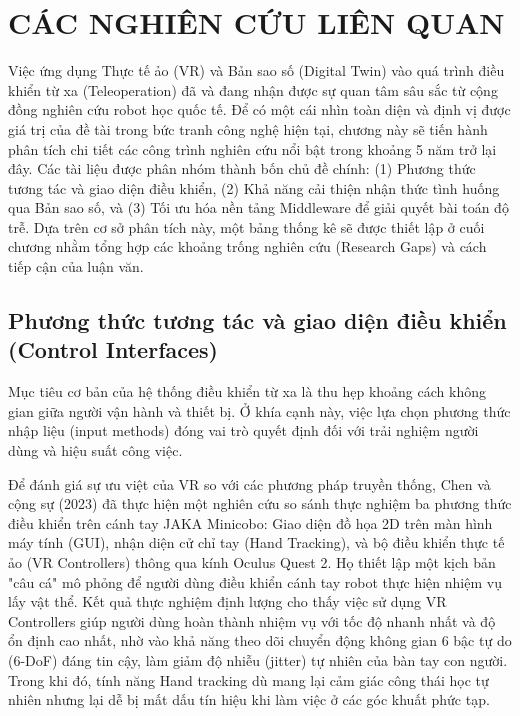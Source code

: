 \chapter{CÁC NGHIÊN CỨU LIÊN QUAN}
\label{chap:related_works}

Việc ứng dụng Thực tế ảo (VR) và Bản sao số (Digital Twin) vào quá trình điều khiển từ xa (Teleoperation) đã và đang nhận được sự quan tâm sâu sắc từ cộng đồng nghiên cứu robot học quốc tế. Để có một cái nhìn toàn diện và định vị được giá trị của đề tài trong bức tranh công nghệ hiện tại, chương này sẽ tiến hành phân tích chi tiết các công trình nghiên cứu nổi bật trong khoảng 5 năm trở lại đây. Các tài liệu được phân nhóm thành bốn chủ đề chính: (1) Phương thức tương tác và giao diện điều khiển, (2) Khả năng cải thiện nhận thức tình huống qua Bản sao số, và (3) Tối ưu hóa nền tảng Middleware để giải quyết bài toán độ trễ. Dựa trên cơ sở phân tích này, một bảng thống kê sẽ được thiết lập ở cuối chương nhằm tổng hợp các khoảng trống nghiên cứu (Research Gaps) và cách tiếp cận của luận văn.

\section{Phương thức tương tác và giao diện điều khiển (Control Interfaces)}

Mục tiêu cơ bản của hệ thống điều khiển từ xa là thu hẹp khoảng cách không gian giữa người vận hành và thiết bị. Ở khía cạnh này, việc lựa chọn phương thức nhập liệu (input methods) đóng vai trò quyết định đối với trải nghiệm người dùng và hiệu suất công việc. 

Để đánh giá sự ưu việt của VR so với các phương pháp truyền thống, Chen và cộng sự (2023) \cite{chen2023comparing} đã thực hiện một nghiên cứu so sánh thực nghiệm ba phương thức điều khiển trên cánh tay JAKA Minicobo: Giao diện đồ họa 2D trên màn hình máy tính (GUI), nhận diện cử chỉ tay (Hand Tracking), và bộ điều khiển thực tế ảo (VR Controllers) thông qua kính Oculus Quest 2. Họ thiết lập một kịch bản "câu cá" mô phỏng để người dùng điều khiển cánh tay robot thực hiện nhiệm vụ lấy vật thể. Kết quả thực nghiệm định lượng cho thấy việc sử dụng VR Controllers giúp người dùng hoàn thành nhiệm vụ với tốc độ nhanh nhất và độ ổn định cao nhất, nhờ vào khả năng theo dõi chuyển động không gian 6 bậc tự do (6-DoF) đáng tin cậy, làm giảm độ nhiễu (jitter) tự nhiên của bàn tay con người. Trong khi đó, tính năng Hand tracking dù mang lại cảm giác công thái học tự nhiên nhưng lại dễ bị mất dấu tín hiệu khi làm việc ở các góc khuất phức tạp. 

